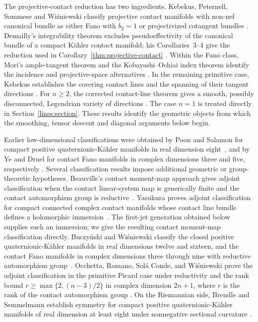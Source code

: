 The projective-contact reduction has two ingredients. Kebekus,
Peternell, Sommese and Wi\'sniewski classify projective contact
manifolds with non-nef canonical bundle as either Fano with $b_2=1$
or projectivized cotangent bundles \cite[Theorem~1.1]{KPSW2000}.
Demailly's integrability theorem excludes pseudoeffectivity of the
canonical bundle of a compact K\"ahler contact manifold; his
Corollaries~3--4 give the reduction used in
Corollary~\ref{thm:projective-contact}
\cite[Corollaries~2--4]{Demailly2000}.
Within the Fano class, Mori's ample-tangent theorem and the
Kobayashi--Ochiai index theorem identify the incidence and
projective-space alternatives \cite{Mori1979,KO1973}. In the
remaining primitive case, Kebekus establishes the covering contact
lines and the spanning of their tangent directions
\cite{Kebekus2001}. For $n\geq2$, the corrected contact-line theorem gives a smooth,
possibly disconnected, Legendrian variety of directions
\cite[corrected version, Theorem~3.1 and Remark~3.2]{Buczynski2010}.
The case $n=1$ is treated directly in Section~\ref{lines:section}.
These results identify the geometric objects from which the
smoothing, tensor descent and diagonal arguments below begin.


Earlier low-dimensional classifications were obtained by Poon and Salamon
for compact positive quaternionic-K\"ahler manifolds in real dimension
eight~\cite{PoonSalamon1991}, and by Ye and Druel for contact Fano manifolds in
complex dimensions three and five, respectively
\cite{Ye1994,Druel1998}.
Several classification results impose additional geometric or
group-theoretic hypotheses.  Beauville's contact moment-map approach gives adjoint
classification when the contact linear-system map is generically finite and
the contact automorphism group is reductive~\cite[Theorem~0.1]{Beauville1998}.
Yasukura proves adjoint classification for compact connected complex
contact manifolds whose contact line bundle defines a holomorphic
immersion~\cite[Theorem~1.1]{Yasukura2023v12}. The first-jet generation
obtained below supplies such an immersion; we give the resulting
contact moment-map classification directly.
Buczy\'nski and Wi\'sniewski classify the closed positive quaternionic-K\"ahler
manifolds in real dimensions twelve and sixteen, and the contact Fano
manifolds in complex dimensions three through nine with reductive automorphism
group~\cite[Theorems~1.1--1.2]{BW2022}.
Occhetta, Romano, Sol\'a Conde, and Wi\'sniewski prove the adjoint
classification in the primitive Picard case under reductivity and the rank
bound $r\geq\max\{2,(n-3)/2\}$ in complex dimension $2n+1$,
where $r$ is the rank of the contact automorphism group
\cite[Theorem~6.1]{OcchettaEtAl2021}.
On the Riemannian side, Brendle and Semmelmann establish symmetry for
compact positive quaternionic-K\"ahler manifolds of real dimension at least
eight under nonnegative sectional curvature
\cite[Corollary~2]{BrendleSemmelmann2025}.

